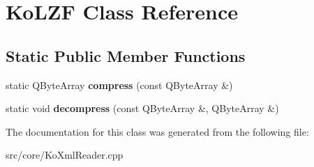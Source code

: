 \hypertarget{classKoLZF}{
\section{KoLZF Class Reference}
\label{classKoLZF}
}
\subsection*{Static Public Member Functions}
\begin{DoxyCompactItemize}
\item 
\hypertarget{classKoLZF_a8e964dd556cbad6f6254dda54583c568}{
static QByteArray {\bfseries compress} (const QByteArray \&)}
\label{classKoLZF_a8e964dd556cbad6f6254dda54583c568}

\item 
\hypertarget{classKoLZF_a9b57c707fb0be57023fa552a5e7fc576}{
static void {\bfseries decompress} (const QByteArray \&, QByteArray \&)}
\label{classKoLZF_a9b57c707fb0be57023fa552a5e7fc576}

\end{DoxyCompactItemize}


The documentation for this class was generated from the following file:\begin{DoxyCompactItemize}
\item 
src/core/KoXmlReader.cpp\end{DoxyCompactItemize}
